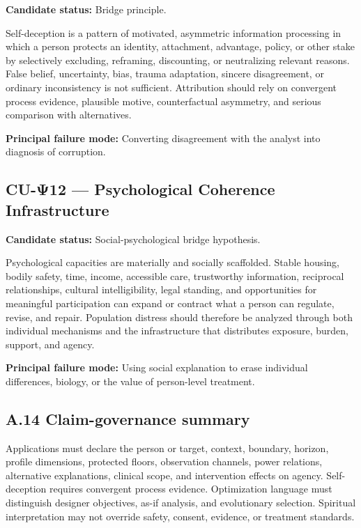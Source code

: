 \documentclass[
  11pt,
]{article}
\begin{document}
\textbf{Candidate status:} Bridge principle.

Self-deception is a pattern of motivated, asymmetric information
processing in which a person protects an identity, attachment,
advantage, policy, or other stake by selectively excluding, reframing,
discounting, or neutralizing relevant reasons. False belief,
uncertainty, bias, trauma adaptation, sincere disagreement, or ordinary
inconsistency is not sufficient. Attribution should rely on convergent
process evidence, plausible motive, counterfactual asymmetry, and
serious comparison with alternatives.

\textbf{Principal failure mode:} Converting disagreement with the
analyst into diagnosis of corruption.

\subsection{CU-Ψ12 --- Psychological Coherence
Infrastructure}\label{cu-ux3c812-psychological-coherence-infrastructure}

\textbf{Candidate status:} Social-psychological bridge hypothesis.

Psychological capacities are materially and socially scaffolded. Stable
housing, bodily safety, time, income, accessible care, trustworthy
information, reciprocal relationships, cultural intelligibility, legal
standing, and opportunities for meaningful participation can expand or
contract what a person can regulate, revise, and repair. Population
distress should therefore be analyzed through both individual mechanisms
and the infrastructure that distributes exposure, burden, support, and
agency.

\textbf{Principal failure mode:} Using social explanation to erase
individual differences, biology, or the value of person-level treatment.

\subsection{A.14 Claim-governance
summary}\label{a.14-claim-governance-summary}

Applications must declare the person or target, context, boundary,
horizon, profile dimensions, protected floors, observation channels,
power relations, alternative explanations, clinical scope, and
intervention effects on agency. Self-deception requires convergent
process evidence. Optimization language must distinguish designer
objectives, as-if analysis, and evolutionary selection. Spiritual
interpretation may not override safety, consent, evidence, or treatment
standards.
\end{document}
